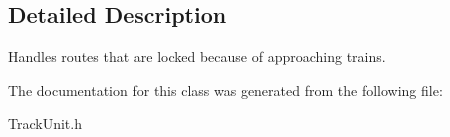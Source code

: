 \subsection{Detailed Description}
Handles routes that are locked because of approaching trains. 

The documentation for this class was generated from the following file\+:\begin{DoxyCompactItemize}
\item 
Track\+Unit.\+h\end{DoxyCompactItemize}
